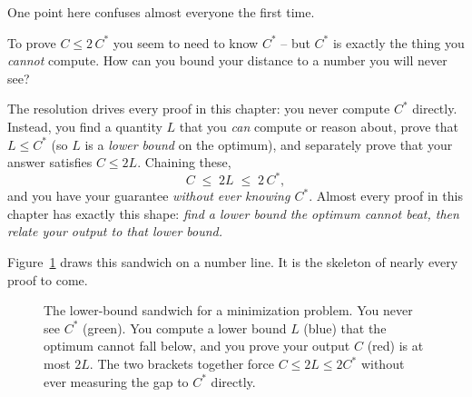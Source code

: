 One point here confuses almost everyone the first time.

\begin{trapbox}
To prove $C \le 2\,C^{*}$ you seem to need to know $C^{*}$ -- but $C^{*}$ is
exactly the thing you \emph{cannot} compute. How can you bound your distance
to a number you will never see?

The resolution drives every proof in this chapter: you never compute $C^{*}$ directly.
Instead, you find a quantity $L$ that you \emph{can} compute or reason about,
prove that $L \le C^{*}$ (so $L$ is a \emph{lower bound} on the optimum), and
separately prove that your answer satisfies $C \le 2L$. Chaining these,
\[
C \;\le\; 2L \;\le\; 2\,C^{*},
\]
and you have your guarantee \emph{without ever knowing $C^{*}$}. Almost every
proof in this chapter has exactly this shape: \emph{find a lower bound the
optimum cannot beat, then relate your output to that lower bound.}
\end{trapbox}

Figure~\ref{ch34:sandwich} draws this sandwich on a number line. It is the
skeleton of nearly every proof to come.

\begin{figure}[h]
\centering
{}
\caption{The lower-bound sandwich for a minimization problem. You never see
$C^{*}$ (green). You compute a lower bound $L$ (blue) that the optimum cannot
fall below, and you prove your output $C$ (red) is at most $2L$. The two
brackets together force $C \le 2L \le 2C^{*}$ without ever measuring the gap to
$C^{*}$ directly.}
\label{ch34:sandwich}
\end{figure}

